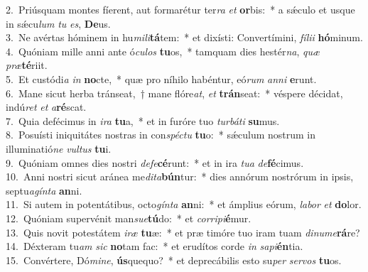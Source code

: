 {2.~}Priúsquam montes fíerent, aut formarétur ter\textit{ra} \textit{et} \textbf{or}bis:~* a sǽculo et usque in sǽcu\textit{lum} \textit{tu} \textit{es}, \textbf{De}us.\\
{3.~}Ne avértas hóminem in hu\textit{mi}\textit{li}\textbf{tá}tem:~* et dixísti: Convertímini, \textit{fí}\textit{li}\textit{i} \textbf{hó}minum.\\
{4.~}Quóniam mille anni ante ó\textit{cu}\textit{los} \textbf{tu}os,~* tamquam dies hestér\textit{na}, \textit{quæ} \textit{præ}\textbf{té}riit.\\
{5.~}Et custódi\textit{a} \textit{in} \textbf{no}cte,~* quæ pro níhilo habéntur, eó\textit{rum} \textit{an}\textit{ni} \textbf{e}runt.\\
{6.~}Mane sicut herba tránseat,~† mane flóre\textit{at}, \textit{et} \textbf{trán}seat:~* véspere décidat, indú\textit{ret} \textit{et} \textit{a}\textbf{ré}scat.\\
{7.~}Quia defécimus in \textit{i}\textit{ra} \textbf{tu}a,~* et in furóre tuo \textit{tur}\textit{bá}\textit{ti} \textbf{su}mus.\\
{8.~}Posuísti iniquitátes nostras in con\textit{spé}\textit{ctu} \textbf{tu}o:~* sǽculum nostrum in illuminatió\textit{ne} \textit{vul}\textit{tus} \textbf{tu}i.\\
{9.~}Quóniam omnes dies nostri \textit{de}\textit{fe}\textbf{cé}runt:~* et in ira \textit{tu}\textit{a} \textit{de}\textbf{fé}cimus.\\
{10.~}Anni nostri sicut aránea me\textit{di}\textit{ta}\textbf{bún}tur:~* dies annórum nostrórum in ipsis, septu\textit{a}\textit{gín}\textit{ta} \textbf{an}ni.\\
{11.~}Si autem in potentátibus, octo\textit{gín}\textit{ta} \textbf{an}ni:~* et ámplius eórum, \textit{la}\textit{bor} \textit{et} \textbf{do}lor.\\
{12.~}Quóniam supervénit man\textit{su}\textit{e}\textbf{tú}do:~* et \textit{cor}\textit{ri}\textit{pi}\textbf{é}mur.\\
{13.~}Quis novit potestátem \textit{i}\textit{ræ} \textbf{tu}æ:~* et præ timóre tuo iram tuam \textit{di}\textit{nu}\textit{me}\textbf{rá}re?\\
{14.~}Déxteram tu\textit{am} \textit{sic} \textbf{no}tam fac:~* et erudítos corde \textit{in} \textit{sa}\textit{pi}\textbf{én}tia.\\
{15.~}Convértere, Dó\textit{mi}\textit{ne}, \textbf{ús}quequo?~* et deprecábilis esto su\textit{per} \textit{ser}\textit{vos} \textbf{tu}os.\\
